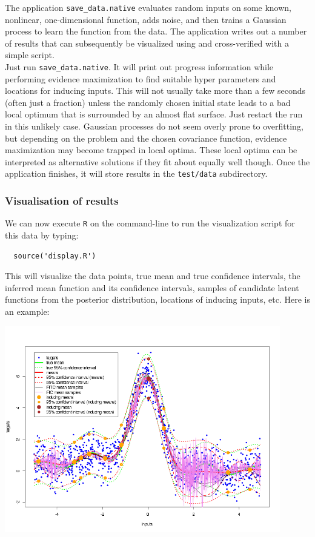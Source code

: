 \documentclass[10pt]{report}
\begin{document}
The application \verb=save_data.native= evaluates random inputs on some
known, nonlinear, one-dimensional function, adds noise, and then trains
a Gaussian process to learn the function from the data.  The application
writes out a number of results that can subsequently be visualized using
 and cross-verified with a simple
 script.\\

Just run \verb=save_data.native=.  It will print out progress information
while performing evidence maximization to find suitable hyper parameters
and locations for inducing inputs.  This will not usually take more than a
few seconds (often just a fraction) unless the randomly chosen initial state
leads to a bad local optimum that is surrounded by an almost flat surface.
Just restart the run in this unlikely case.  Gaussian processes do not seem
overly prone to overfitting, but depending on the problem and the chosen
covariance function, evidence maximization may become trapped in local
optima. These local optima can be interpreted as alternative solutions if
they fit about equally well though. Once the application finishes, it will
store results in the \verb=test/data= subdirectory.

\subsubsection{Visualisation of results}

We can now execute \verb=R= on the command-line to run the visualization script
for this data by typing:

\begin{verbatim}
  source('display.R')
\end{verbatim}

This will visualize the data points, true mean and true confidence intervals,
the inferred mean function and its confidence intervals, samples of candidate
latent functions from the posterior distribution, locations of inducing inputs,
etc.  Here is an example:

\begin{center}
\includegraphics[width=12cm]{fit.png}
\end{center}
\end{document}

